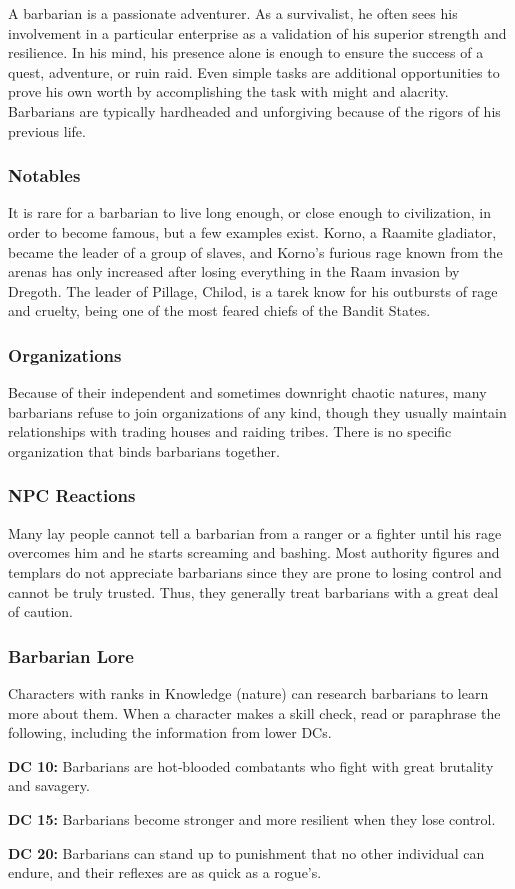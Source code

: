 A barbarian is a passionate adventurer. As a survivalist, he often sees his involvement in a particular enterprise as a validation of his superior strength and resilience. In his mind, his presence alone is enough to ensure the success of a quest, adventure, or ruin raid. Even simple tasks are additional opportunities to prove his own worth by accomplishing the task with might and alacrity. Barbarians are typically hardheaded and unforgiving because of the rigors of his previous life.

\subsubsection{Notables}

It is rare for a barbarian to live long enough, or close enough to civilization, in order to become famous, but a few examples exist. Korno, a Raamite gladiator, became the leader of a group of slaves, and Korno's furious rage known from the arenas has only increased after losing everything in the Raam invasion by Dregoth. The leader of Pillage, Chilod, is a tarek know for his outbursts of rage and cruelty, being one of the most feared chiefs of the Bandit States.

\subsubsection{Organizations}

Because of their independent and sometimes downright chaotic natures, many barbarians refuse to join organizations of any kind, though they usually maintain relationships with trading houses and raiding tribes. There is no specific organization that binds barbarians together.

\subsubsection{NPC Reactions}

Many lay people cannot tell a barbarian from a ranger or a fighter until his rage overcomes him and he starts screaming and bashing. Most authority figures and templars do not appreciate barbarians since they are prone to losing control and cannot be truly trusted. Thus, they generally treat barbarians with a great deal of caution.

\subsubsection{Barbarian Lore}

Characters with ranks in Knowledge (nature) can research barbarians to learn more about them. When a character makes a skill check, read or paraphrase the following, including the information from lower DCs.

\textbf{DC 10:} Barbarians are hot‐blooded combatants who fight with great brutality and savagery.

\textbf{DC 15:} Barbarians become stronger and more resilient when they lose control.

\textbf{DC 20:} Barbarians can stand up to punishment that no other individual can endure, and their reflexes are as quick as a rogue's.